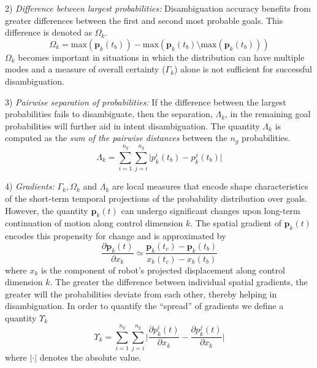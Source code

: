 \documentclass[natbib, twocolumn]{svjour3}          %
\begin{document}
2) \textit{Difference between largest probabilities:} Disambiguation accuracy benefits from greater differences between the first and second most probable goals. This difference is denoted as $\Omega_k$.
\begin{equation}
\Omega_k = \text{max}(\boldsymbol{p}_k(t_b)) - \text{max}(\boldsymbol{p}_k(t_b) \setminus \text{max}(\boldsymbol{p}_k(t_b)))
\end{equation}
$\Omega_k$ becomes important in situations in which the distribution can have multiple modes and a measure of overall certainty ($\Gamma_k$) alone is not sufficient for successful disambiguation. 

3) \textit{Pairwise separation of probabilities:} If the difference between the largest probabilities fails to disambiguate, then the separation, $\Lambda_k$, in the remaining goal probabilities will further aid in intent disambiguation. The quantity $\Lambda_k$ is computed as the \textit{sum of the pairwise distances} between the $n_g$ probabilities.
\begin{equation}
\Lambda_k = \sum_{i=1}^{n_g}\sum_{j=i}^{n_g}\lvert p^i_k(t_b) - p^j_k(t_b)\rvert
\end{equation}

4) \textit{Gradients:} $\Gamma_k, \Omega_k$ and $\Lambda_k$ are local measures that encode shape characteristics of the short-term temporal projections of the probability distribution over goals. However, the quantity $\boldsymbol{p}_k(t)$ can undergo significant changes upon long-term continuation of motion along control dimension $k$. The spatial gradient of $\boldsymbol{p}_k(t)$ encodes this propensity for change and is approximated by 
\begin{equation*}
\frac{\partial\boldsymbol{p}_k(t)}{\partial x_k} \simeq \frac{\boldsymbol{p}_k(t_c) - \boldsymbol{p}_k(t_b)}{x_k(t_c) - x_k(t_b)}
\end{equation*}
where $x_k$ is the component of robot's projected displacement along control dimension $k$. The greater the difference between individual spatial gradients, the greater will the probabilities deviate from each other, thereby helping in disambiguation. In order to quantify the ``spread'' of gradients we define a quantity $\Upsilon_k$ 
\begin{equation}
\Upsilon_k = \sum_{i=1}^{n_g}\sum_{j=i}^{n_g}\Big \lvert\frac{\partial p^i_k(t)}{\partial x_k} - \frac{\partial p^j_k(t)}{\partial x_k}\Big \rvert
\end{equation}
where $\lvert\cdot\rvert$ denotes the absolute value. 
\end{document}
